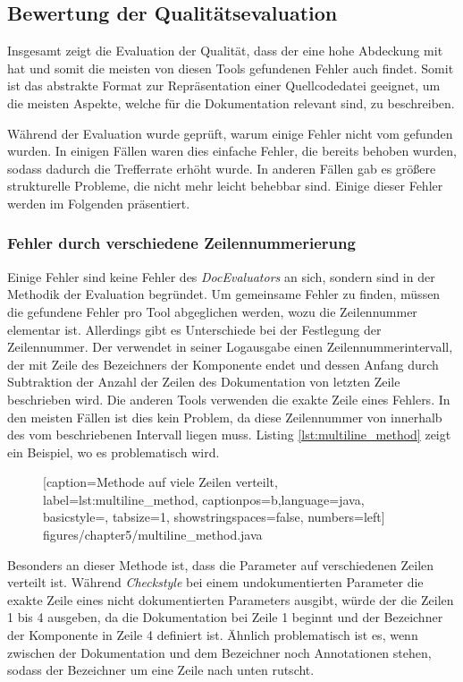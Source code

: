 \subsection{Bewertung der Qualitätsevaluation}
Insgesamt zeigt die Evaluation der Qualität, dass der \doceval eine hohe Abdeckung mit \checkpmd hat und somit die meisten von diesen Tools gefundenen Fehler auch findet. Somit ist das abstrakte Format zur Repräsentation einer Quellcodedatei geeignet, um die meisten Aspekte, welche für die Dokumentation relevant sind, zu beschreiben. 

Während der Evaluation wurde geprüft, warum einige Fehler nicht vom \doceval gefunden wurden. In einigen Fällen waren dies einfache Fehler, die bereits behoben wurden, sodass dadurch die Trefferrate erhöht wurde. In anderen Fällen gab es größere strukturelle Probleme, die nicht mehr leicht behebbar sind. Einige dieser Fehler werden im Folgenden präsentiert. 
\subsubsection{Fehler durch verschiedene Zeilennummerierung}

Einige Fehler sind keine Fehler des \textit{DocEvaluators} an sich, sondern sind in der Methodik der Evaluation begründet. Um gemeinsame Fehler zu finden, müssen die gefundene Fehler pro Tool abgeglichen werden, wozu die Zeilennummer elementar ist. Allerdings gibt es Unterschiede bei der Festlegung der Zeilennummer. Der \doceval verwendet in seiner Logausgabe einen Zeilennummerintervall, der mit Zeile des Bezeichners der Komponente endet und dessen Anfang durch Subtraktion der Anzahl der Zeilen des Dokumentation von letzten Zeile beschrieben wird. Die anderen Tools verwenden die exakte Zeile eines Fehlers. In den meisten Fällen ist dies kein Problem, da diese Zeilennummer von \checkpmd innerhalb des vom \doceval beschriebenen Intervall liegen muss. Listing \ref{lst:multiline_method} zeigt ein Beispiel, wo es problematisch wird.

		\begin{figure}[ht!]
			
			[caption={Methode auf viele Zeilen verteilt},
			label={lst:multiline_method},
			captionpos=b,language=java, basicstyle=\footnotesize, tabsize=1, showstringspaces=false,  numbers=left]
			{figures/chapter5/multiline_method.java}
		\end{figure}
Besonders an dieser Methode ist, dass die Parameter auf verschiedenen Zeilen verteilt ist. Während \textit{Checkstyle} bei einem undokumentierten Parameter die exakte Zeile eines nicht dokumentierten Parameters ausgibt, würde der \doceval die Zeilen 1 bis 4 ausgeben, da die Dokumentation bei Zeile 1 beginnt und der Bezeichner der Komponente in Zeile 4 definiert ist. Ähnlich problematisch ist es, wenn zwischen der Dokumentation und dem Bezeichner noch Annotationen stehen, sodass der Bezeichner um eine Zeile nach unten rutscht.  

